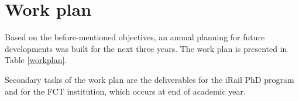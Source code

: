 	

\newpage
\section{Work plan}
\label{sec:44}

Based on the before-mentioned objectives, an annual planning for future developments was built for the next three years. 
The work plan is presented in Table \ref{workplan}. 


Secondary tasks of the work plan are the deliverables for the iRail PhD program and for the FCT institution, which occurs at end of academic year. 







